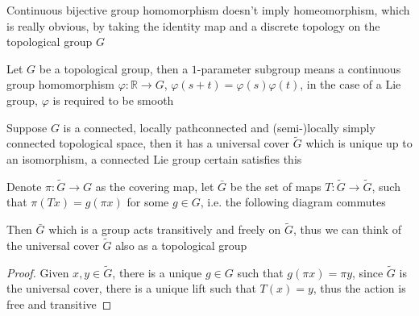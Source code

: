 \documentclass[main]{subfiles}
\begin{document}
\begin{example}
Continuous bijective group homomorphism doesn't imply homeomorphism, which is really obvious, by taking the identity map and a discrete topology on the topological group $G$
\end{example}

\begin{definition}
Let $G$ be a topological group, then a $1$-parameter subgroup means a continuous group homomorphism $\varphi:\mathbb R\to G$, $\varphi(s+t)=\varphi(s)\varphi(t)$, in the case of a Lie group, $\varphi$ is required to be smooth
\end{definition}

\begin{definition}
Suppose $G$ is a connected, locally pathconnected and (semi-)locally simply connected topological space, then it has a universal cover $\tilde G$ which is unique up to an isomorphism, a connected Lie group certain satisfies this
\end{definition}

\begin{proposition}
Denote $\pi:\tilde G\to G$ as the covering map, let $\bar G$ be the set of maps $T:\tilde G\to\tilde G$, such that $\pi(Tx)=g(\pi x)$ for some $g\in G$, i.e. the following diagram commutes
\begin{center}
\end{center}
Then $\bar G$ which is a group acts transitively and freely on $\tilde G$, thus we can think of the universal cover $\tilde G$ also as a topological group
\end{proposition}

\begin{proof}
Given $x,y\in \tilde G$, there is a unique $g\in G$ such that $g(\pi x)=\pi y$, since $\tilde G$ is the universal cover, there is a unique lift such that $T(x)=y$, thus the action is free and transitive
\end{proof}
\end{document}
